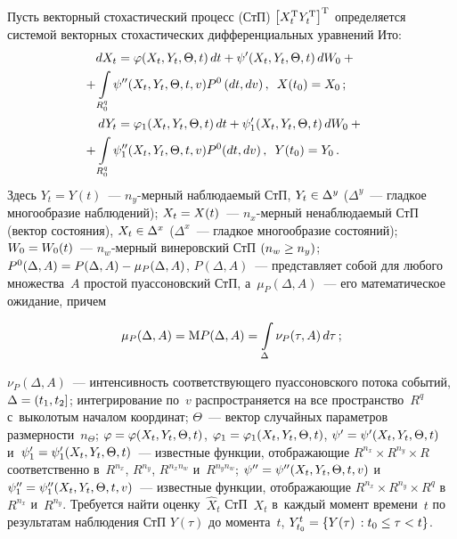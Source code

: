 \begin{multicols}{2}
Пусть векторный стохастический процесс (СтП) 
$\left[ X_t^{\mathrm{T}} Y_t^{\mathrm{T}} \right]^{\mathrm{T}}$
определяется системой векторных стохастических дифференциальных
уравнений Ито:
    \begin{align}
   \hspace*{-1mm}dX_t &=\varphi (X_t,Y_t,\Theta, t)\, dt + \psi' (X_t,Y_t,\Theta, t)\, dW_0 +{}\notag\\
    &\hspace*{-9.5mm}{}
+\iii_{R_0^q} \psi'' (X_t,Y_t,\Theta, t,v) P^0 \,(dt, dv)\,,\enskip 
X(t_0) = X_0\,;\label{e2.1-s1}\\
\hspace*{-1mm}dY_t &=\varphi_1 (X_t,Y_t,\Theta, t) \,dt +
    \psi_1' (X_t,Y_t,\Theta, t)\, dW_0 + {}\notag\\
&\hspace*{-9.5mm}{}+\int\limits_{R_0^q} \psi_1'' (X_t,Y_t,\Theta, t,v) P^0
    (dt,dv)\,,\enskip Y(t_0) = Y_0\,.\label{e2.2-s1}
    \end{align}
Здесь $Y_t=Y(t)$~--- $n_y$-мер\-ный наблюдаемый
СтП, $Y_t \hm\in \Delta^y$ ($\Delta^y$~--- гладкое многообразие наблюдений); 
$X_t \hm=X(t)$~--- $n_x$-мер\-ный ненаблюдаемый
СтП (вектор состояния), $X_t \hm\in \Delta^x$ ($\Delta^x$~--- 
гладкое многообразие состояний); $W_0 \hm=W_0(t)$~--- $n_w$-мер\-ный
винеровский СтП $(n_w\hm\ge n_y)$; $P^0(\Delta,A)\hm=P(\Delta,A)\hm-\mu_P (\Delta,A)$, 
$P(\Delta,A)$~--- представляет \mbox{собой} для любого множества~$A$ 
простой пуассоновский СтП, а~$\mu_P (\Delta,A)$~--- его математическое ожидание, причем

    \vspace*{2pt}

\noindent
    $$
    \mu_P (\Delta,A)=\mathrm{M} P (\Delta,A)=\int\limits_\Delta \nu_P(\tau, A)\, d\tau\,;
    $$
    
        \vspace*{-2pt}
        
        \noindent
$\nu_P (\Delta, A)$~--- интенсивность соответствующего пуассоновского потока событий, 
$\Delta \hm=(t_1,t_2]$; интегрирование по~$v$ распространяется на все пространство~$R^q$ 
с~выколотым началом координат; $\Theta$~--- вектор случайных параметров 
размерности~$n_\Theta$;\linebreak
$\varphi\hm=\varphi(X_t,Y_t,\Theta, t)$, $\varphi_1\hm=\varphi_1(X_t,Y_t,\Theta, t)$,
 $\psi'\hm=\psi'(X_t,Y_t,\Theta, t)$ и~$\psi_1'\hm=\psi_1'(X_t,Y_t,\Theta, t)$~--- 
 известные функции, отображающие
$R^{n_x}\times R^{n_y}\times  R$ соответ\-ственно в~$R^{n_x}$,
$R^{n_y}$, $R^{n_xn_w}$ и~$R^{n_yn_w}$;
$\psi''\hm=\psi''(X_t,Y_t,\Theta, t,v)$ и~$\psi_1''\hm=\psi_1''(X_t,Y_t,\Theta,
t,v)$~--- известные функции, отображающие $R^{n_x}\times
R^{n_y}\times R^q$ в~$R^{n_x}$ и~$R^{n_y}$. Требуется найти оценку~$\hat X_t$ 
СтП~$X_t$ в~каж\-дый момент времени~$t$ по результатам
наблюдения СтП $Y(\tau)$ до момента~$t$, $Y_{t_0}^t \hm=
 \{ Y(\tau) \,: t_0 \hm\le \tau\hm< t\}$.


\end{multicols}
